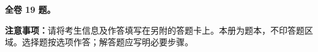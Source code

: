 \renewcommand{\ExamHeader}{新课标Ⅰ卷体例 · 原创模拟样张}
\renewcommand{\ExamEdition}{\ifExamAnswers 参考答案\else 数学试题\fi}
\newcommand{\PyramidEdge}{2}

\ifExamAnswers
  
\else
  \textbf{全卷 19 题。}\par
  \textbf{注意事项：}请将考生信息及作答填写在另附的答题卡上。本册为题本，不印答题区域。选择题按选项作答；解答题应写明必要步骤。
  
\fi

